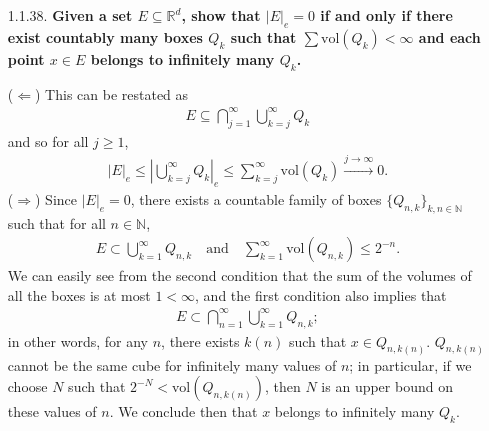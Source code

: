 \documentclass[a4paper,12pt]{article}
\begin{document}
\begin{enumerate}
    \item[1.1.38.]
        \boldmath\textbf{Given a set $E \subseteq \mathbb{R}^d$, show that $|E|_e = 0$ if and only if there exist countably many boxes $Q_k$ such that $\sum \text{vol}(Q_k) < \infty$ and each point $x \in E$ belongs to infinitely many $Q_k$.
        }\unboldmath \par
        ($\Leftarrow$) %
        This can be restated as
        \begin{align*}
            E \subseteq \bigcap_{j = 1}^\infty \bigcup_{k = j}^\infty Q_k
        \end{align*}
        and so for all $j \geq 1$,
        \begin{align*}
            |E|_e \leq \left| \bigcup_{k = j}^\infty Q_k \right|_e \leq \sum_{k = j}^\infty \text{vol}(Q_k) \xrightarrow{j \to \infty} 0.
        \end{align*}
        ($\Rightarrow$) Since $|E|_e = 0$, there exists a countable family of boxes $\{ Q_{n, k} \}_{k, n \in \mathbb{N}}$ such that for all $n \in \mathbb{N}$,
        \begin{align*}
            E \subset \bigcup_{k = 1}^\infty Q_{n, k} \quad \text{and} \quad \sum_{k = 1}^\infty \text{vol}(Q_{n, k}) \leq 2^{-n}.
        \end{align*}
        We can easily see from the second condition that the sum of the volumes of all the boxes is at most $1 < \infty$, and the first condition also implies that
        \begin{align*}
            E \subset \bigcap_{n = 1}^\infty \bigcup_{k = 1}^\infty Q_{n, k};
        \end{align*}
        in other words, for any $n$, there exists $k(n)$ such that $x \in Q_{n, k(n)}$. $Q_{n, k(n)}$ cannot be the same cube for infinitely many values of $n$; in particular, if we choose $N$ such that $2^{-N} < \text{vol}(Q_{n, k(n)})$, then $N$ is an upper bound on these values of $n$. We conclude then that $x$ belongs to infinitely many $Q_k$.


\end{enumerate}
\end{document}
